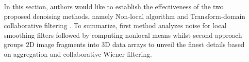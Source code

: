 %




In this section, authors would like to establish the effectiveness of the two proposed denoising methods, namely Non-local algorithm \cite{Buades} and Transform-domain collaborative filtering \cite{dabov2007image}. To summarize, first method analyzes noise for  local smoothing filters followed by computing nonlocal means whilst second approach groups 2D image fragments into 3D data arrays to unveil the finest details based on aggregation and collaborative Wiener filtering.  

